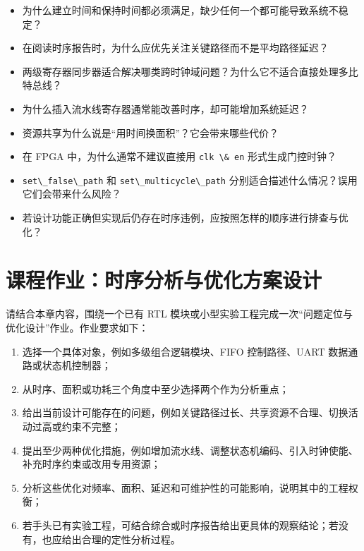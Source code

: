 \begin{itemize}
\tightlist
\item
  为什么建立时间和保持时间都必须满足，缺少任何一个都可能导致系统不稳定？
\item
  在阅读时序报告时，为什么应优先关注关键路径而不是平均路径延迟？
\item
  两级寄存器同步器适合解决哪类跨时钟域问题？为什么它不适合直接处理多比特总线？
\item
  为什么插入流水线寄存器通常能改善时序，却可能增加系统延迟？
\item
  资源共享为什么说是``用时间换面积''？它会带来哪些代价？
\item
  在 FPGA 中，为什么通常不建议直接用 \passthrough{\lstinline!clk \& en!}
  形式生成门控时钟？
\item
  \passthrough{\lstinline!set\_false\_path!} 和
  \passthrough{\lstinline!set\_multicycle\_path!}
  分别适合描述什么情况？误用它们会带来什么风险？
\item
  若设计功能正确但实现后仍存在时序违例，应按照怎样的顺序进行排查与优化？
\end{itemize}

\section{课程作业：时序分析与优化方案设计}\label{ux8bfeux7a0bux4f5cux4e1aux65f6ux5e8fux5206ux6790ux4e0eux4f18ux5316ux65b9ux6848ux8bbeux8ba1}

请结合本章内容，围绕一个已有 RTL
模块或小型实验工程完成一次``问题定位与优化设计''作业。作业要求如下：

\begin{enumerate}
\def\labelenumi{\arabic{enumi}.}
\tightlist
\item
  选择一个具体对象，例如多级组合逻辑模块、FIFO 控制路径、UART
  数据通路或状态机控制器；
\item
  从时序、面积或功耗三个角度中至少选择两个作为分析重点；
\item
  给出当前设计可能存在的问题，例如关键路径过长、共享资源不合理、切换活动过高或约束不完整；
\item
  提出至少两种优化措施，例如增加流水线、调整状态机编码、引入时钟使能、补充时序约束或改用专用资源；
\item
  分析这些优化对频率、面积、延迟和可维护性的可能影响，说明其中的工程权衡；
\item
  若手头已有实验工程，可结合综合或时序报告给出更具体的观察结论；若没有，也应给出合理的定性分析过程。
\end{enumerate}

